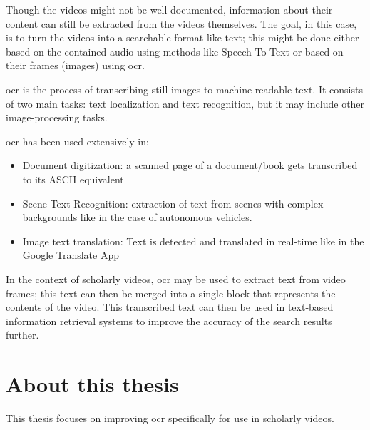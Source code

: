Though the videos might not be well documented, information about their content can still be extracted from the videos themselves. The goal, in this case, is to turn the videos into a searchable format like text; this might be done either based on the contained audio using methods like Speech-To-Text or based on their frames (images) using \gls{ocr}.

\gls{ocr} is the process of transcribing still images to machine-readable text. It consists of two main tasks: text localization and text recognition, but it may include other image-processing tasks.


\gls{ocr} has been used extensively in:
\begin{itemize}
    \item Document digitization: a scanned page of a document/book gets transcribed to its ASCII equivalent
    \item Scene Text Recognition: extraction of text from scenes with complex backgrounds like in the case of autonomous vehicles.
    \item Image text translation: Text is detected and translated in real-time like in the Google Translate App
\end{itemize}

In the context of scholarly videos, \gls{ocr} may be used to extract text from video frames; this text can then be merged into a single block that represents the contents of the video.
This transcribed text can then be used in text-based information retrieval systems to improve the accuracy of the search results further.

\section{About this thesis}

This thesis focuses on improving \gls{ocr} specifically for use in scholarly videos.

